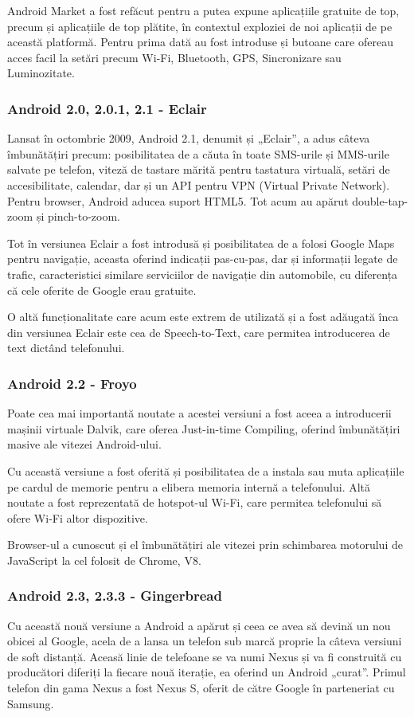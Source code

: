 \documentclass[12pt,a4paper]{article}
\begin{document}
	Android Market a fost refăcut pentru a putea expune aplicațiile gratuite de top, precum și aplicațiile de top plătite, în contextul exploziei de noi aplicații de pe această platformă. Pentru prima dată au fost introduse și butoane care ofereau acces facil la setări precum Wi-Fi, Bluetooth, GPS, Sincronizare sau Luminozitate.


\subsubsection{Android 2.0, 2.0.1, 2.1 - Eclair}
Lansat în octombrie 2009, Android 2.1, denumit și „Eclair”, a adus câteva îmbunătățiri precum: posibilitatea de a căuta în toate SMS-urile și MMS-urile salvate pe telefon, viteză de tastare mărită pentru tastatura virtuală, setări de accesibilitate, calendar, dar și un API pentru VPN (Virtual Private Network). Pentru browser, Android aducea suport HTML5. Tot acum au apărut double-tap-zoom și pinch-to-zoom.
	
	Tot în versiunea Eclair a fost introdusă și posibilitatea de a folosi Google Maps pentru navigație, aceasta oferind indicații pas-cu-pas, dar și informații legate de trafic, caracteristici similare serviciilor de navigație din automobile, cu diferența că cele oferite de Google erau gratuite.

	O altă funcționalitate care acum este extrem de utilizată și a fost adăugată înca din versiunea Eclair este cea de Speech-to-Text, care permitea introducerea de text dictând telefonului.
	

\subsubsection{Android 2.2 - Froyo}
Poate cea mai importantă noutate a acestei versiuni a fost aceea a introducerii mașinii virtuale Dalvik, care oferea Just-in-time Compiling, oferind îmbunătățiri masive ale vitezei Android-ului.

	Cu această versiune a fost oferită și posibilitatea de a instala sau muta aplicațiile pe cardul de memorie pentru a elibera memoria internă a telefonului. Altă noutate a fost reprezentată de hotspot-ul Wi-Fi, care permitea telefonului să ofere Wi-Fi altor dispozitive.

	Browser-ul a cunoscut și el îmbunătățiri ale vitezei prin schimbarea motorului de JavaScript la cel folosit de Chrome, V8.


\subsubsection{Android 2.3, 2.3.3 - Gingerbread}
Cu această nouă versiune a Android a apărut și ceea ce avea să devină un nou obicei al Google, acela de a lansa un telefon sub marcă proprie la câteva versiuni de soft distanță. Aceasă linie de telefoane se va numi Nexus și va fi construită cu producători diferiți la fiecare nouă iterație, ea oferind un Android „curat”. Primul telefon din gama Nexus a fost Nexus S, oferit de către Google în parteneriat cu Samsung.
\end{document}
